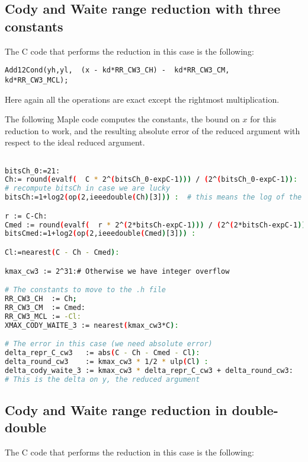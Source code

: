 \subsection{Cody and Waite range reduction with three constants}
The C code that performs the reduction in this case is the following:

\begin{lstlisting}[caption={Cody and Waite range reduction with three
    constants},firstnumber=35]
	Add12Cond(yh,yl,  (x - kd*RR_CW3_CH) -  kd*RR_CW3_CM,   kd*RR_CW3_MCL);
\end{lstlisting}

Here again all the operations are exact except the rightmost multiplication.

The following Maple code computes the constants, the bound on $x$ for
this reduction to work, and the resulting absolute error of the reduced
argument with respect to the ideal reduced argument.

\begin{lstlisting}[caption={Maple script for computing constants for
    Cody and Waite 3\label{trigo:lst:cw3maple} },
  language={sh}, numbers=none]% of course it's maple
%Skip a line here, I don't know why, otherwise latex eats the first line

bitsCh_0:=21:
Ch:= round(evalf(  C * 2^(bitsCh_0-expC-1))) / (2^(bitsCh_0-expC-1)):
# recompute bitsCh in case we are lucky
bitsCh:=1+log2(op(2,ieeedouble(Ch)[3])) :  # this means the log of the denominator

r := C-Ch:
Cmed := round(evalf(  r * 2^(2*bitsCh-expC-1))) / (2^(2*bitsCh-expC-1)):
bitsCmed:=1+log2(op(2,ieeedouble(Cmed)[3])) :

Cl:=nearest(C - Ch - Cmed):

kmax_cw3 := 2^31:# Otherwise we have integer overflow

# The constants to move to the .h file
RR_CW3_CH  := Ch;
RR_CW3_CM  := Cmed:
RR_CW3_MCL := -Cl:
XMAX_CODY_WAITE_3 := nearest(kmax_cw3*C):

# The error in this case (we need absolute error)
delta_repr_C_cw3   := abs(C - Ch - Cmed - Cl):
delta_round_cw3    := kmax_cw3 * 1/2 * ulp(Cl) :
delta_cody_waite_3 := kmax_cw3 * delta_repr_C_cw3 + delta_round_cw3:
# This is the delta on y, the reduced argument
\end{lstlisting}

\subsection{Cody and Waite range reduction in double-double\label{trigo:CWDD}}
The C code that performs the reduction in this case is the following:

